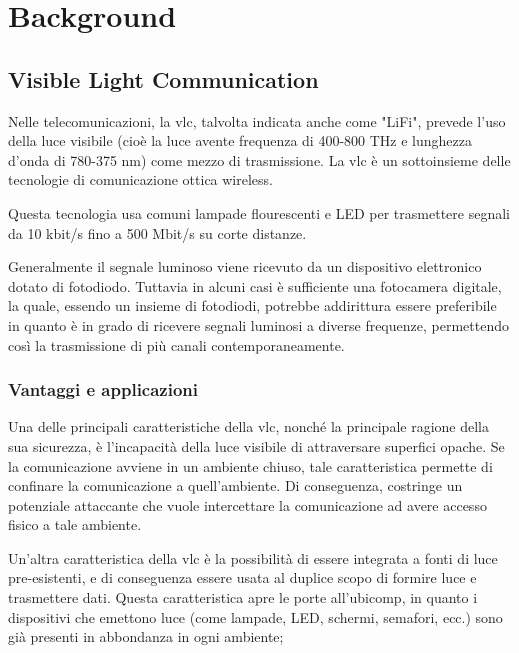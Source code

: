 \chapter{Background}
\label{cap:background}


\section{Visible Light Communication}
Nelle telecomunicazioni, la \gls{vlc}, talvolta indicata anche come "LiFi", prevede l'uso della luce visibile (cioè la luce avente frequenza di 400-800 THz e lunghezza d'onda di 780-375 nm) come mezzo di trasmissione. La \gls{vlc} è un sottoinsieme delle tecnologie di comunicazione ottica wireless.

Questa tecnologia usa comuni lampade flourescenti e LED per trasmettere segnali da 10 kbit/s fino a 500 Mbit/s su corte distanze.

Generalmente il segnale luminoso viene ricevuto da un dispositivo elettronico dotato di fotodiodo. Tuttavia in alcuni casi è sufficiente una fotocamera digitale, la quale, essendo un insieme di fotodiodi, potrebbe addirittura essere preferibile in quanto è in grado di ricevere segnali luminosi a diverse frequenze, permettendo così la trasmissione di più canali contemporaneamente.

\subsection{Vantaggi e applicazioni}
Una delle principali caratteristiche della \gls{vlc}, nonché la principale ragione della sua sicurezza, è l'incapacità della luce visibile di attraversare superfici opache. Se la comunicazione avviene in un ambiente chiuso, tale caratteristica permette di confinare la comunicazione a quell'ambiente. Di conseguenza, costringe un potenziale attaccante che vuole intercettare la comunicazione ad avere accesso fisico a tale ambiente.

Un'altra caratteristica della \gls{vlc} è la possibilità di essere integrata a fonti di luce pre-esistenti, e di conseguenza essere usata al duplice scopo di formire luce e trasmettere dati. Questa caratteristica apre le porte all'\gls{ubicomp}\glsfirstoccur, in quanto i dispositivi che emettono luce (come lampade, LED, schermi, semafori, ecc.) sono già presenti in abbondanza in ogni ambiente;

